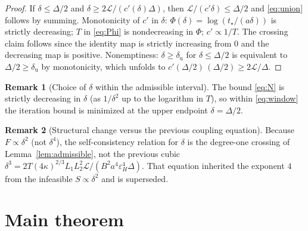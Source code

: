 \documentclass[11pt,a4paper]{article}
\theoremstyle{plain}
\theoremstyle{definition}
\newtheorem{remark}{Remark}
\newcommand{\eps}{\varepsilon}
\newcommand{\epsH}{\eps_{H}}
\newcommand{\LL}{\mathcal{L}}
\newcommand{\tstar}{t_\star}
\begin{document}
\begin{proof}
If $\delta \le \Delta/2$ and $\delta \ge 2\LL/(c'(\delta)\Delta)$, then
$\LL/(c'\delta) \le \Delta/2$ and \eqref{eq:union} follows by summing.
Monotonicity of $c'$ in $\delta$: $\Phi(\delta) = \log(\tstar/(a\delta))$
is strictly decreasing; $T$ in \eqref{eq:Phi} is nondecreasing in $\Phi$;
$c' \propto 1/T$. The crossing claim follows since the identity map is
strictly increasing from $0$ and the decreasing map is positive.
Nonemptiness: $\delta \ge \delta_{\mathrm{u}}$ for $\delta \le \Delta/2$
is equivalent to $\Delta/2 \ge \delta_{\mathrm{u}}$ by monotonicity, which
unfolds to $c'(\Delta/2)\,(\Delta/2) \ge 2\LL/\Delta$.
\end{proof}

\begin{remark}[Choice of $\delta$ within the admissible interval]
\label{rem:deltachoice}
The bound \eqref{eq:N} is strictly decreasing in $\delta$ (as
$1/\delta^2$ up to the logarithm in $T$), so within \eqref{eq:window} the
iteration bound is minimized at the upper endpoint $\delta = \Delta/2$.
\end{remark}

\begin{remark}[Structural change versus the previous coupling equation]
\label{rem:coupling}
Because $F \propto \delta^2$ (not $\delta^4$), the self-consistency
relation for $\delta$ is the degree-one crossing of
Lemma~\ref{lem:admissible}, not the previous cubic
$\delta^3 = 2T(4\kappa)^{2/3}L_1L_2^2\LL/(B^2a^4\epsH^4\Delta)$. That
equation inherited the exponent $4$ from the infeasible
$S \propto \delta^2$ and is superseded.
\end{remark}

\section{Main theorem}\label{sec:main}
\end{document}
